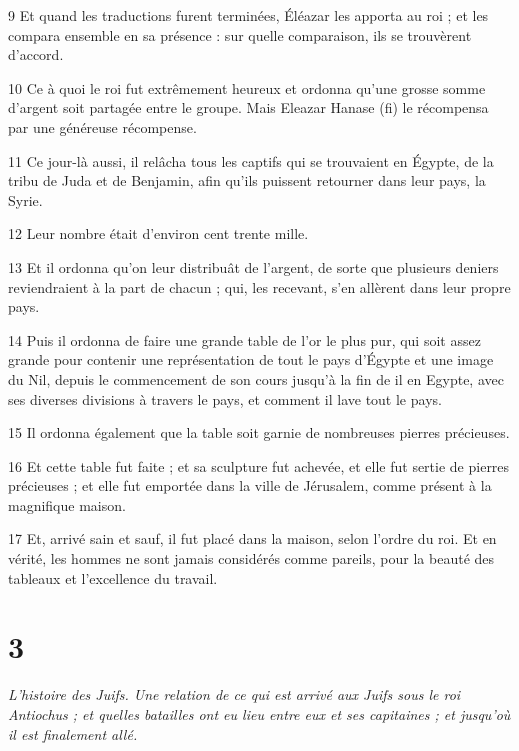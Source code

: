 \par 9 Et quand les traductions furent terminées, Éléazar les apporta au roi ; et les compara ensemble en sa présence : sur quelle comparaison, ils se trouvèrent d'accord.

\par 10 Ce à quoi le roi fut extrêmement heureux et ordonna qu'une grosse somme d'argent soit partagée entre le groupe. Mais Eleazar Hanase (fi) le récompensa par une généreuse récompense.

\par 11 Ce jour-là aussi, il relâcha tous les captifs qui se trouvaient en Égypte, de la tribu de Juda et de Benjamin, afin qu'ils puissent retourner dans leur pays, la Syrie.

\par 12 Leur nombre était d'environ cent trente mille.

\par 13 Et il ordonna qu'on leur distribuât de l'argent, de sorte que plusieurs deniers reviendraient à la part de chacun ; qui, les recevant, s'en allèrent dans leur propre pays.

\par 14 Puis il ordonna de faire une grande table de l'or le plus pur, qui soit assez grande pour contenir une représentation de tout le pays d'Égypte et une image du Nil, depuis le commencement de son cours jusqu'à la fin de il en Egypte, avec ses diverses divisions à travers le pays, et comment il lave tout le pays.

\par 15 Il ordonna également que la table soit garnie de nombreuses pierres précieuses.

\par 16 Et cette table fut faite ; et sa sculpture fut achevée, et elle fut sertie de pierres précieuses ; et elle fut emportée dans la ville de Jérusalem, comme présent à la magnifique maison.

\par 17 Et, arrivé sain et sauf, il fut placé dans la maison, selon l'ordre du roi. Et en vérité, les hommes ne sont jamais considérés comme pareils, pour la beauté des tableaux et l'excellence du travail.

\chapter{3}

\par \textit{L'histoire des Juifs. Une relation de ce qui est arrivé aux Juifs sous le roi Antiochus ; et quelles batailles ont eu lieu entre eux et ses capitaines ; et jusqu'où il est finalement allé.}

